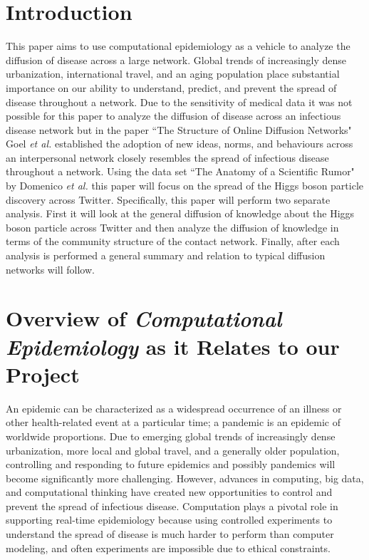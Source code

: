 \documentclass[12pt, oneside, openany]{article} %
\begin{document}

\tableofcontents
\newpage

\section{Introduction}
This paper aims to use computational epidemiology as a vehicle to analyze the diffusion of disease across a large network. Global trends of increasingly dense urbanization, international travel, and an aging population place substantial importance on our ability to understand, predict, and prevent the spread of disease throughout a network. Due to the sensitivity of medical data it was not possible for this paper to analyze the diffusion of disease across an infectious disease network but in the paper ``The Structure of Online Diffusion Networks" Goel \emph{et al.} established the adoption of new ideas, norms, and behaviours across an interpersonal network closely resembles the spread of infectious disease throughout a network. Using the data set ``The Anatomy of a Scientific Rumor" by Domenico \emph{et al.} this paper will focus on the spread of the Higgs boson particle discovery across Twitter. Specifically, this paper will perform two separate analysis. First it will look at the general diffusion of knowledge about the Higgs boson particle across Twitter and then analyze the diffusion of knowledge in terms of the community structure of the contact network. Finally, after each analysis is performed a general summary and relation to typical diffusion networks will follow.

\section{Overview of \textit{Computational Epidemiology} as it Relates to our Project}
An epidemic can be characterized as a widespread occurrence of an illness or other health-related event at a particular time; a pandemic is an epidemic of worldwide proportions. Due to emerging global trends of increasingly dense urbanization, more local and global travel, and a generally older population, controlling and responding to future epidemics and possibly pandemics will become significantly more challenging. However, advances in computing, big data, and computational thinking have created new opportunities to control and prevent the spread of infectious disease. Computation plays a pivotal role in supporting real-time epidemiology because using controlled experiments to understand the spread of disease is much harder to perform than computer modeling, and often experiments are impossible due to ethical constraints. 
\end{document}

